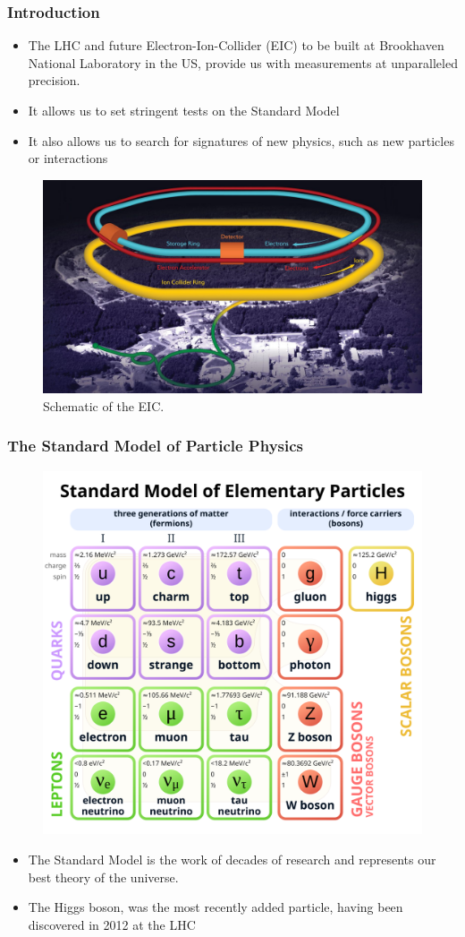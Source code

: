 \documentclass{beamer}
\begin{document}
\begin{frame}
  \frametitle{Introduction}

  \begin{itemize}
  \item The LHC and future Electron-Ion-Collider (EIC) to be built at Brookhaven National Laboratory in the US, provide us with measurements at unparalleled precision.
  \item It allows us to set stringent tests on the Standard Model
  \item It also allows us to search for signatures of new physics, such as new particles or interactions
  \end{itemize}


  \begin{figure}
    \centering
    \includegraphics[width=0.44\linewidth]{./gfx/eic.jpg}
    \caption{Schematic of the EIC.}
  \end{figure}
\end{frame}


\begin{frame}
  \frametitle{The Standard Model of Particle Physics}


  \begin{figure}
    \centering
    \includegraphics[width=0.4\linewidth]{./gfx/standard-model.png}
  \end{figure}

  \begin{itemize}
  \item The Standard Model is the work of decades of research and represents our best theory of the universe.
  \item The Higgs boson, was the most recently added particle, having been discovered in 2012 at the LHC
  \end{itemize}

\end{frame}
\end{document}

